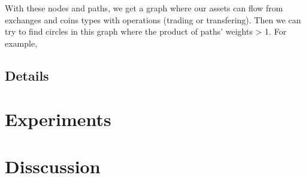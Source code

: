 \documentclass{manuscript}
\begin{document}
    With these nodes and paths, we get a graph where our assets can flow from exchanges and coins types with operations
    (trading or transfering). Then we can try to find circles in this graph where the product of paths' weights > 1. For
    example,




    \subsection{Details}

    \section{Experiments}
    \section{Disscussion}


    
\end{document}
